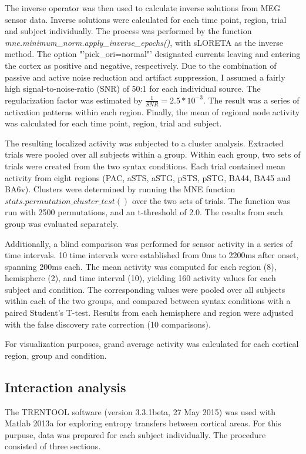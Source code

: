 The inverse operator was then used to calculate inverse solutions from MEG sensor data.
Inverse solutions were calculated for each time point, region, trial and subject individually.
The process was performed by the function \emph{mne.minimum\_norm.apply\_inverse\_epochs()}, with sLORETA as the inverse method.
The option "'pick\_ori=normal"' designated currents leaving and entering the cortex as positive and negative, respectively.
Due to the combination of passive and active noise reduction and artifact suppression, I assumed a fairly high signal-to-noise-ratio (SNR) of 50:1 for each individual source.
The regularization factor was estimated by $\frac{1}{SNR} = 2.5*10^{-3}$.
The result was a series of activation patterns within each region.
Finally, the mean of regional node activity was calculated for each time point, region, trial and subject.


The resulting localized activity was subjected to a cluster analysis.
Extracted trials were pooled over all subjects within a group.
Within each group, two sets of trials were created from the two syntax conditions.
Each trial contained mean activity from eight regions (PAC, aSTS, aSTG, pSTS, pSTG, BA44, BA45 and BA6v).
Clusters were determined by running the MNE function $stats.permutation\_cluster\_test()$ \cite{3.3.clustertest} over the two sets of trials.
The function was run with 2500 permutations, and an t-threshold of 2.0.
The results from each group was evaluated separately.

Additionally, a blind comparison was performed for sensor activity in a series of time intervals.
10 time intervals were established from 0ms to 2200ms after onset, spanning 200ms each.
The mean activity was computed for each region (8), hemisphere (2), and time interval (10), yielding 160 activity values for each subject and condition.
The corresponding values were pooled over all subjects within each of the two groups, and compared between syntax conditions with a paired Student's T-test.
Results from each hemisphere and region were adjusted with the false discovery rate correction (10 comparisons).

For visualization purposes, grand average activity was calculated for each cortical region, group and condition.


\subsection{Interaction analysis}

The TRENTOOL software (version 3.3.1beta, 27 May 2015) was used with Matlab 2013a for exploring entropy transfers between cortical areas.
For this purpuse, data was prepared for each subject individually.
The procedure consisted of three sections.


